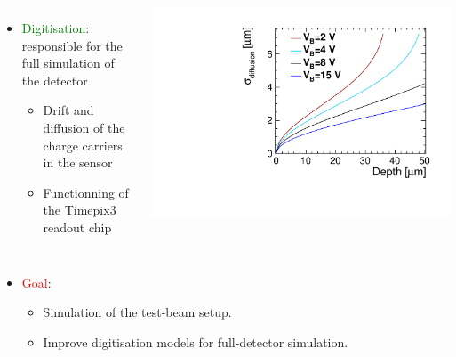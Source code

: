 \begin{frame}
  \begin{columns}
    \begin{itemize}
    \item \textcolor{Green}{Digitisation}: responsible for the
      full simulation of the detector
      \begin{itemize}
      \item Drift and diffusion of the charge carriers in the sensor
      \item Functionning of the Timepix3 readout chip
      \end{itemize}
    \end{itemize}

    \centering
    \includegraphics[width=\textwidth]{../figures/ChargeSharing/Diffusion_vs_Bias.pdf}
  \end{columns}

  \begin{itemize}
  \item \textcolor{Red}{Goal}:
    \begin{itemize}
    \item Simulation of the test-beam setup.
    \item Improve digitisation models for full-detector simulation.
    \end{itemize}
  \end{itemize}

\end{frame}

